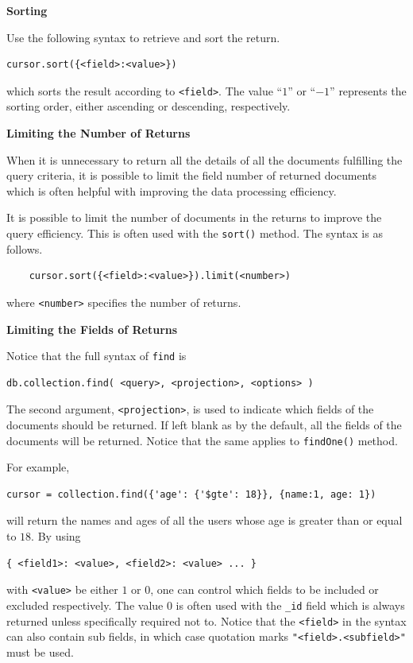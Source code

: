 \vspace{0.1in}
\noindent \textbf{Sorting}
\vspace{0.1in}

Use the following syntax to retrieve and sort the return.
\begin{lstlisting}
cursor.sort({<field>:<value>})
\end{lstlisting}
which sorts the result according to \verb|<field>|. The value ``$1$'' or ``$-1$'' represents the sorting order, either ascending or descending, respectively.

\vspace{0.1in}
\noindent \textbf{Limiting the Number of Returns}
\vspace{0.1in}

When it is unnecessary to return all the details of all the documents fulfilling the query criteria, it is possible to limit the field number of returned documents which is often helpful with improving the data processing efficiency.

It is possible to limit the number of documents in the returns to improve the query efficiency. This is often used with the \verb|sort()| method. The syntax is as follows.
\begin{lstlisting}
	cursor.sort({<field>:<value>}).limit(<number>)
\end{lstlisting}
where \verb|<number>| specifies the number of returns.

\vspace{0.1in}
\noindent \textbf{Limiting the Fields of Returns}
\vspace{0.1in}

Notice that the full syntax of \verb|find| is
\begin{lstlisting}
db.collection.find( <query>, <projection>, <options> )
\end{lstlisting}
The second argument, \verb|<projection>|, is used to indicate which fields of the documents should be returned. If left blank as by the default, all the fields of the documents will be returned. Notice that the same applies to \verb|findOne()| method.

For example,
\begin{lstlisting}
cursor = collection.find({'age': {'$gte': 18}}, {name:1, age: 1})
\end{lstlisting}
will return the names and ages of all the users whose age is greater than or equal to $18$. By using
\begin{lstlisting}
{ <field1>: <value>, <field2>: <value> ... }
\end{lstlisting}
with \verb|<value>| be either $1$ or $0$, one can control which fields to be included or excluded respectively. The value $0$ is often used with the \verb|_id| field which is always returned unless specifically required not to. Notice that the \verb|<field>| in the syntax can also contain sub fields, in which case quotation marks \verb|"<field>.<subfield>"| must be used.

